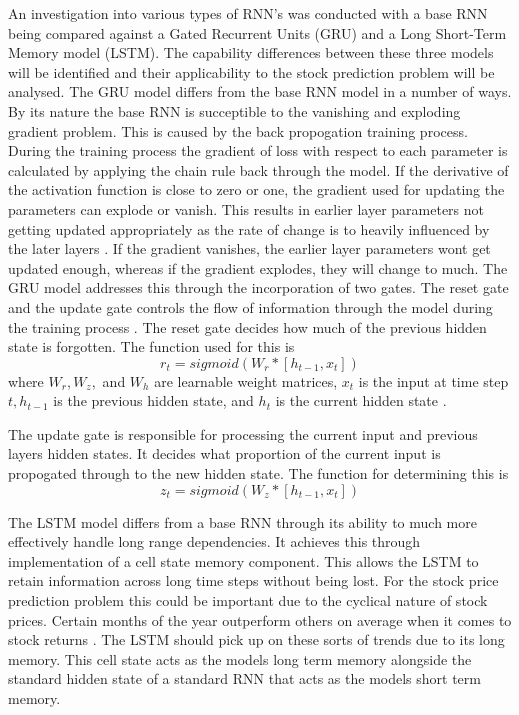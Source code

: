 \documentclass[10pt,twocolumn,letterpaper]{article}
\begin{document}
An investigation into various types of RNN's was conducted with a base RNN being 
compared against a Gated Recurrent Units (GRU) and a Long Short-Term Memory model (LSTM).
The capability differences between these three models will be identified and their 
applicability to the stock prediction problem will be analysed. The GRU model differs 
from the base RNN model in a number of ways. By its nature the base RNN is succeptible 
to the vanishing and exploding gradient problem. This is caused by the back propogation 
training process. During the training process the gradient of loss with respect to 
each parameter is calculated by applying the chain rule back through the model.
If the derivative of the activation function is close to zero or one, the gradient
used for updating the parameters can explode or vanish. This results in earlier 
layer parameters not getting updated appropriately as the rate of change is to heavily 
influenced by the later layers \cite{analyticsvidhyaChallengeVanishingExploding}. If the gradient vanishes, the earlier layer parameters 
wont get updated enough, whereas if the gradient explodes, they will change to much.
The GRU model addresses this through the incorporation of two gates. The reset gate and the 
update gate controls the flow of information through the model during the training process \cite{em360techWhatGated}.
The reset gate decides how much of the previous hidden state is forgotten. The function 
used for this is 
\begin{equation}
   r_t = sigmoid(W_r * [h_{t-1}, x_t])
\end{equation}
where $W_r, W_z,$ and $W_h$ are learnable weight matrices, $x_t$ is the input at time step $t, h_{t-1}$ is the previous hidden state,
and $h_t$ is the current hidden state \cite{geeksforgeeksGatedRecurrent}.

The update gate is responsible for processing the current input and previous layers hidden 
states. It decides what proportion of the current input is propogated through to the new 
hidden state. The function for determining this is
\begin{equation}
   z_t = sigmoid(W_z * [h_{t-1}, x_t])
\end{equation}

The LSTM model differs from a base RNN through its ability to much more effectively handle 
long range dependencies. It achieves this through implementation of a cell state memory
component. This allows the LSTM to retain information across long time steps without 
being lost. For the stock price prediction problem this could be important due to the 
cyclical nature of stock prices. Certain months of the year outperform others on 
average when it comes to stock returns \cite{asx}. The LSTM should pick up on these 
sorts of trends due to its long memory. This cell state acts as the models 
long term memory alongside the standard hidden state of a standard RNN that acts 
as the models short term memory. 
\end{document}
